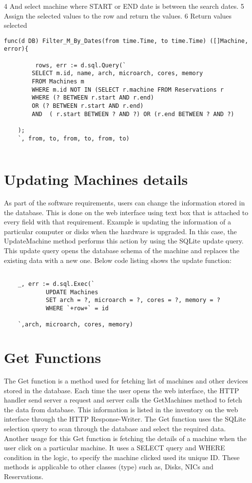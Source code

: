 4 And  select machine where START or END date is between the search dates.
5 Assign the selected values to the row and return the values.
6 Return values selected 
\begin{lstlisting}[caption=Searching available, label=Search available machine]
func(d DB) Filter_M_By_Dates(from time.Time, to time.Time) ([]Machine, error){

         rows, err := d.sql.Query(`
		SELECT m.id, name, arch, microarch, cores, memory
		FROM Machines m
		WHERE m.id NOT IN (SELECT r.machine FROM Reservations r
		WHERE (? BETWEEN r.start AND r.end)
		OR (? BETWEEN r.start AND r.end)
		AND  ( r.start BETWEEN ? AND ?) OR (r.end BETWEEN ? AND ?)
	
	);	
	`, from, to, from, to, from, to)


\end{lstlisting}
\section*{Updating Machines details}
As part of the software requirements, users can change the information stored in the database. This is done on the web interface using text box that is attached to every field with that requirement. Example is updating the information of a particular computer or disks when the hardware is upgraded. In this case, the UpdateMachine method performs this action by using the SQLite update query. This update query opens the database schema of the machine and replaces the existing data with a new one.
Below code listing shows the update function:
\begin{lstlisting}[caption=Function for Updating data, label=Update function]

	_, err := d.sql.Exec(`
			UPDATE Machines
			SET arch = ?, microarch = ?, cores = ?, memory = ?
			WHERE `+row+` = id

	`,arch, microarch, cores, memory)

\end{lstlisting}
\section{Get Functions}
The Get function is a method used for fetching list of machines and other devices stored in the database. Each time the user opens the web interface, the HTTP handler send server a request and server calls the GetMachines method to fetch the data from database. This information is listed in the inventory on the web interface through the HTTP Response-Writer. The Get function uses the SQLite selection query to scan through the database and select the required data.  Another usage for this Get function is fetching the details of a machine when the user click on a particular machine. It uses a SELECT query and WHERE condition in the logic, to specify the machine clicked used its unique ID. These methods is applicable to other classes (type) such as, Disks, NICs and Reservations. 
 
